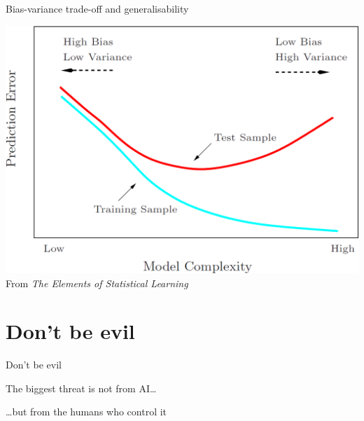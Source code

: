 \begin{frame}{Bias\hyp{}variance trade\hyp{}off and generalisability}
    \begin{center}
        \includegraphics[height=0.8\textheight]{figures/generalisability} \\
        {\scriptsize%
         From \textit{The Elements of Statistical Learning}}
    \end{center}
\end{frame}

\section{Don't be evil}

\begin{frame}{Don't be evil}
    \begin{center}
        \Large%
        The biggest threat is not from AI\ldots

        \vfill\pause

        \ldots but from the humans who control it
    \end{center}
\end{frame}



